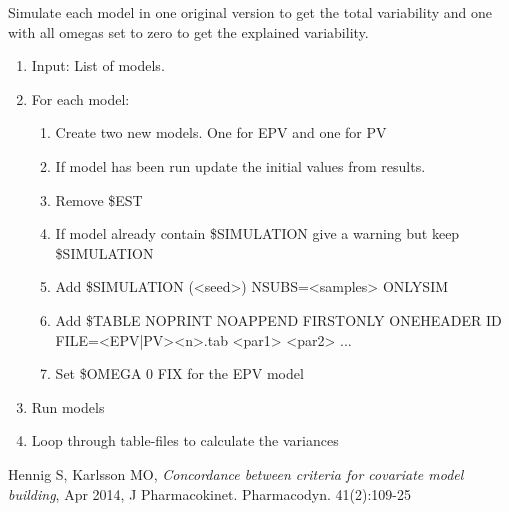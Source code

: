 Simulate each model in one original version to get the total variability and one with all omegas set to zero to get the explained variability.

\begin{enumerate}
	\item Input: List of models.
	\item For each model:
	\begin{enumerate}
		\item Create two new models. One for EPV and one for PV
		\item If model has been run update the initial values from results.
		\item Remove \$EST
		\item If model already contain \$SIMULATION give a warning but keep \$SIMULATION
		\item Add \$SIMULATION (<seed>) NSUBS=<samples> ONLYSIM
		\item Add \$TABLE NOPRINT NOAPPEND FIRSTONLY ONEHEADER ID FILE=<EPV|PV><n>.tab <par1> <par2> ...
		\item Set \$OMEGA 0 FIX for the EPV model
	\end{enumerate}
	\item Run models
	\item Loop through table-files to calculate the variances
\end{enumerate}

\begin{thebibliography}{99}
	 Hennig S, Karlsson MO, {\em Concordance between criteria for covariate model building}, Apr 2014, J Pharmacokinet. Pharmacodyn. 41(2):109-25
\end{thebibliography}


